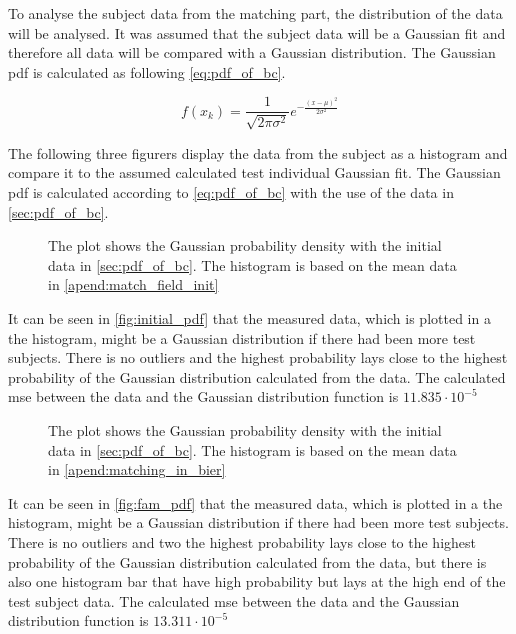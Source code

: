 To analyse the subject data from the matching part, the distribution of the data will be analysed. It was assumed that the subject data will be a Gaussian fit and therefore all data will be compared with a Gaussian distribution. The Gaussian \gls{pdf} is calculated as following \autoref{eq:pdf_of_bc}.

\begin{equation}\label{eq:pdf_of_bc}
f(x_{k}) = \frac{1}{\sqrt{2 \pi \sigma^2}}e^{-\frac{(x-\mu)^2}{2\sigma^2}}
\end{equation}


The following three figurers display the data from the subject as a histogram and compare it to the assumed calculated test individual Gaussian fit. The Gaussian \gls{pdf} is calculated according to \autoref{eq:pdf_of_bc} with the use of the data in \autoref{sec:pdf_of_bc}.



 \begin{figure}[H]
	\centering
	
		\caption{The plot shows the Gaussian probability density with the initial data in \autoref{sec:pdf_of_bc}. The histogram is based on the mean data in \autoref{apend:match_field_init}}
		\label{fig:initial_pdf}
\end{figure}

It can be seen in \autoref{fig:initial_pdf} that the measured data, which is plotted in a the histogram, might be a Gaussian distribution if there had been more test subjects. There is no outliers and the highest probability lays close to the highest probability of the Gaussian distribution calculated from the data. The calculated \gls{mse} between the data and the Gaussian distribution function is $11.835 \cdot 10^{-5}$


 \begin{figure}[H]
	\centering
	
		\caption{The plot shows the Gaussian probability density with the initial data in \autoref{sec:pdf_of_bc}. The histogram is based on the mean data in \autoref{apend:matching_in_bier}}
		\label{fig:fam_pdf}
\end{figure}

It can be seen in \autoref{fig:fam_pdf} that the measured data, which is plotted in a the histogram, might be a Gaussian distribution if there had been more test subjects. There is no outliers and two the highest probability lays close to the highest probability of the Gaussian distribution calculated from the data, but there is also one histogram bar that have high probability but lays at the high end of the test subject data. The calculated \gls{mse} between the data and the Gaussian distribution function is $13.311 \cdot 10^{-5}$


